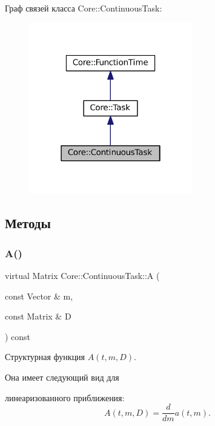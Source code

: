 Граф связей класса Core\+:\+:Continuous\+Task\+:\nopagebreak
\begin{figure}[H]
\begin{center}
\leavevmode
\includegraphics[width=202pt]{class_core_1_1_continuous_task__coll__graph}
\end{center}
\end{figure}


\subsection{Методы}
\hypertarget{class_core_1_1_continuous_task_a75fbac1abe67223cd7938b724c5cce45}{}\label{class_core_1_1_continuous_task_a75fbac1abe67223cd7938b724c5cce45} 
\subsubsection{\texorpdfstring{A()}{A()}}
{\footnotesize\ttfamily virtual Matrix Core\+::\+Continuous\+Task\+::A (\begin{DoxyParamCaption}\item[{const Vector \&}]{m,  }\item[{const Matrix \&}]{D }\end{DoxyParamCaption}) const\hspace{0.3cm}{\ttfamily [pure virtual]}}



Структурная функция $A(t, m, D)$. 

Она имеет следующий вид для


\begin{DoxyItemize}
\item линеаризованного приближения\+: \[A(t, m, D) = \frac{d}{dm} a(t, m).\] 
\end{DoxyItemize}

